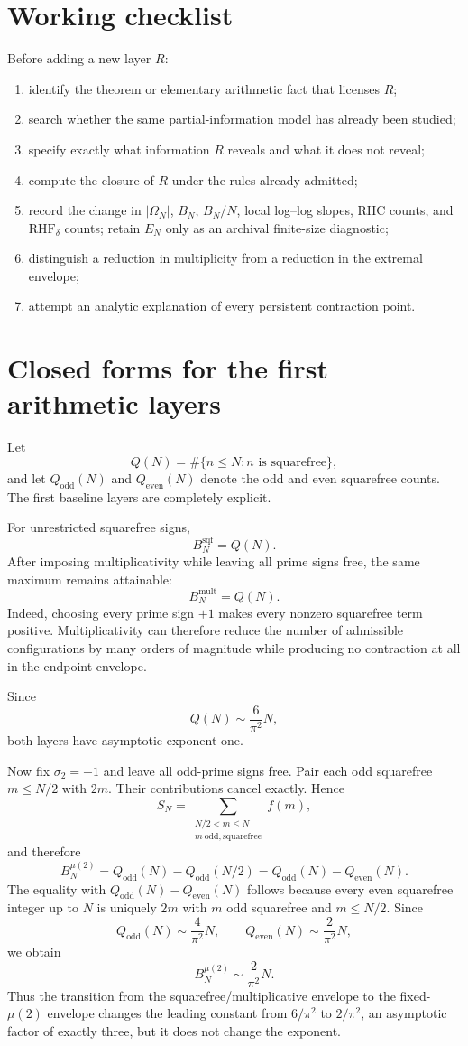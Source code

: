 \documentclass[11pt]{article}
\newcommand{\Om}{\Omega}
\newcommand{\RHF}{\mathrm{RHF}}
\begin{document}
\section{Working checklist}
Before adding a new layer $R$:
\begin{enumerate}
\item identify the theorem or elementary arithmetic fact that licenses $R$;
\item search whether the same partial-information model has already been studied;
\item specify exactly what information $R$ reveals and what it does not reveal;
\item compute the closure of $R$ under the rules already admitted;
\item record the change in $|\Om_N|$, $B_N$, $B_N/N$, local log--log slopes, RHC counts, and $\RHF_\delta$ counts; retain $E_N$ only as an archival finite-size diagnostic;
\item distinguish a reduction in multiplicity from a reduction in the extremal envelope;
\item attempt an analytic explanation of every persistent contraction point.
\end{enumerate}


\section{Closed forms for the first arithmetic layers}
Let
\[
 Q(N)=\#\{n\le N:n\text{ is squarefree}\},
\]
and let $Q_{\mathrm{odd}}(N)$ and $Q_{\mathrm{even}}(N)$ denote the odd and even squarefree counts. The first baseline layers are completely explicit.

For unrestricted squarefree signs,
\[
 \boxed{B_N^{\mathrm{sqf}}=Q(N)}.
\]
After imposing multiplicativity while leaving all prime signs free, the same maximum remains attainable:
\[
 \boxed{B_N^{\mathrm{mult}}=Q(N)}.
\]
Indeed, choosing every prime sign $+1$ makes every nonzero squarefree term positive. Multiplicativity can therefore reduce the number of admissible configurations by many orders of magnitude while producing no contraction at all in the endpoint envelope.

Since
\[
 Q(N)\sim \frac{6}{\pi^2}N,
\]
both layers have asymptotic exponent one.

Now fix $\sigma_2=-1$ and leave all odd-prime signs free. Pair each odd squarefree $m\le N/2$ with $2m$. Their contributions cancel exactly. Hence
\[
 S_N=\sum_{\substack{N/2<m\le N\\m\ \mathrm{odd,squarefree}}}f(m),
\]
and therefore
\[
 \boxed{
 B_N^{\mu(2)}
 =Q_{\mathrm{odd}}(N)-Q_{\mathrm{odd}}(N/2)
 =Q_{\mathrm{odd}}(N)-Q_{\mathrm{even}}(N)
 }.
\]
The equality with $Q_{\mathrm{odd}}(N)-Q_{\mathrm{even}}(N)$ follows because every even squarefree integer up to $N$ is uniquely $2m$ with $m$ odd squarefree and $m\le N/2$. Since
\[
 Q_{\mathrm{odd}}(N)\sim\frac{4}{\pi^2}N,
 \qquad
 Q_{\mathrm{even}}(N)\sim\frac{2}{\pi^2}N,
\]
we obtain
\[
 \boxed{B_N^{\mu(2)}\sim\frac{2}{\pi^2}N}.
\]
Thus the transition from the squarefree/multiplicative envelope to the fixed-$\mu(2)$ envelope changes the leading constant from $6/\pi^2$ to $2/\pi^2$, an asymptotic factor of exactly three, but it does not change the exponent.
\end{document}
